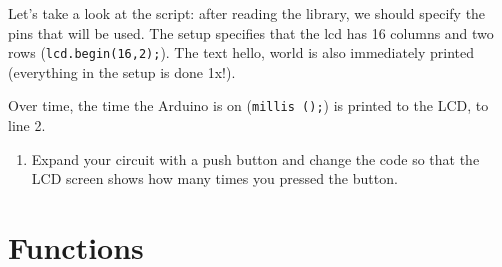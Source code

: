\documentclass{arduino}
\begin{document}
\begin{minipage}{\widemargin}
Let's take a look at the script: after reading the library, we should specify the pins that will be used. The setup specifies that the lcd has 16 columns and two rows (\lstinline{lcd.begin(16,2);}). The text hello, world is also immediately printed (everything in the setup is done 1x!).

Over time, the time the Arduino is on (\lstinline{millis ();}) is printed to the LCD, to line 2.

\begin{enumerate}[label={\alph*})]
\item Expand your circuit with a push button and change the code so that the LCD screen shows how many times you pressed the button.
\end{enumerate}
\end{minipage}

\newpage

\section{Functions}
\end{document}
